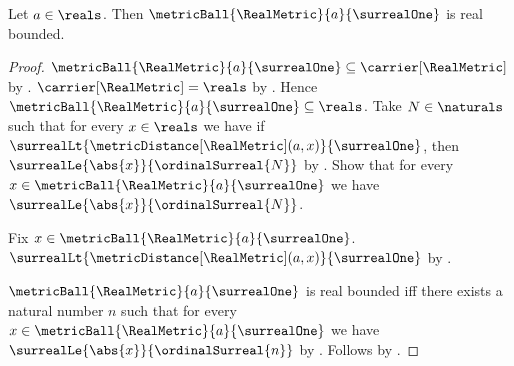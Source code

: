 \begin{proposition}\label{real_unit_ball_is_bounded}
    Let $a\in\reals$.
    Then $\metricBall{\RealMetric}{a}{\surrealOne}$ is real bounded.
\end{proposition}
\begin{proof}
    $\metricBall{\RealMetric}{a}{\surrealOne}
        \subseteq\carrier[\RealMetric]$ by
        .
    $\carrier[\RealMetric]=\reals$ by
        .
    Hence $\metricBall{\RealMetric}{a}{\surrealOne}
        \subseteq\reals$.
    Take $N\in\naturals$ such that for every $x\in\reals$ we have if
        $\surrealLt{\metricDistance[\RealMetric](a,x)}{\surrealOne}$,
        then $\surrealLe{\abs{x}}{\ordinalSurreal{N}}$ by
        .
    Show that for every
        $x\in\metricBall{\RealMetric}{a}{\surrealOne}$ we have
        $\surrealLe{\abs{x}}{\ordinalSurreal{N}}$.
    \begin{subproof}
        Fix $x\in\metricBall{\RealMetric}{a}{\surrealOne}$.
        $\surrealLt{\metricDistance[\RealMetric](a,x)}{\surrealOne}$
            by .
    \end{subproof}
    $\metricBall{\RealMetric}{a}{\surrealOne}$ is real bounded iff
        there exists a natural number $n$ such that for every
        $x\in\metricBall{\RealMetric}{a}{\surrealOne}$ we have
        $\surrealLe{\abs{x}}{\ordinalSurreal{n}}$ by
        .
    Follows by \auto.
\end{proof}
